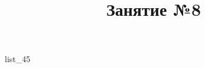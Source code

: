 \documentclass[12pt, a4paper]{article}
\begin{document}
	\title{Занятие №8}
	{list_45}
\end{document}
